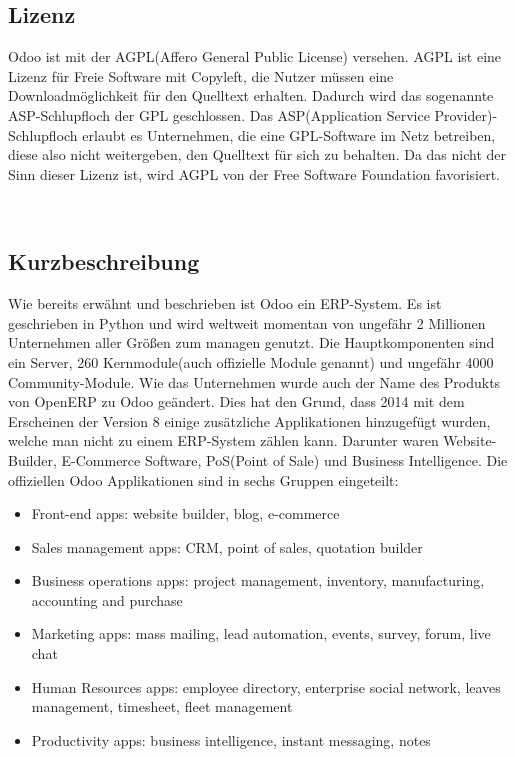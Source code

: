 \subsection{Lizenz}
Odoo ist mit der AGPL(Affero General Public License) versehen. AGPL ist eine Lizenz für Freie Software mit Copyleft, die Nutzer müssen eine Downloadmöglichkeit für den Quelltext erhalten. Dadurch wird das sogenannte ASP-Schlupfloch der GPL geschlossen. Das ASP(Application Service Provider)-Schlupfloch erlaubt es Unternehmen, die eine GPL-Software im Netz betreiben, diese also nicht weitergeben, den Quelltext für sich zu behalten. Da das nicht der Sinn dieser Lizenz ist, wird AGPL von der Free Software Foundation favorisiert.

\\
\subsection{Kurzbeschreibung}
Wie bereits erwähnt und beschrieben ist Odoo ein ERP-System. Es ist geschrieben in Python und wird weltweit momentan von ungefähr 2 Millionen Unternehmen aller Größen zum managen genutzt.
Die Hauptkomponenten sind ein Server, 260 Kernmodule(auch offizielle Module genannt) und ungefähr 4000 Community-Module.
Wie das Unternehmen wurde auch der Name des Produkts von OpenERP zu Odoo geändert. Dies hat den Grund, dass 2014 mit dem Erscheinen der Version 8 einige zusätzliche Applikationen hinzugefügt wurden, welche man nicht zu einem ERP-System zählen kann. Darunter waren Website-Builder, E-Commerce Software, PoS(Point of Sale) und Business Intelligence.
Die offiziellen Odoo Applikationen sind in sechs Gruppen eingeteilt:

\begin{itemize}
	\item Front-end apps: website builder, blog, e-commerce
	\item Sales management apps: CRM, point of sales, quotation builder
	\item Business operations apps: project management, inventory, manufacturing, accounting and purchase
	\item Marketing apps: mass mailing, lead automation, events, survey, forum, live chat
	\item Human Resources apps: employee directory, enterprise social network, leaves management, timesheet, fleet management
	\item Productivity apps: business intelligence, instant messaging, notes
\end{itemize}

